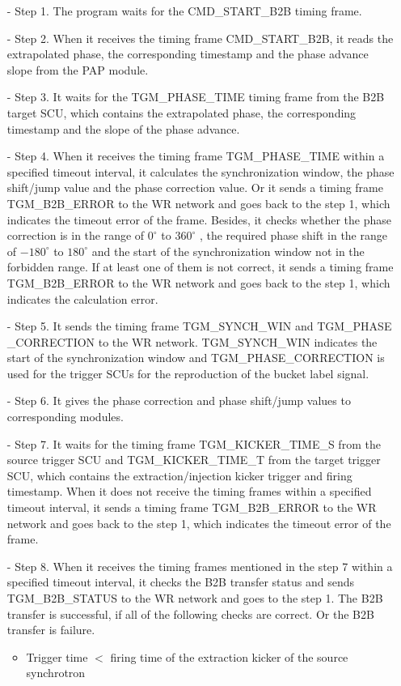 \begin{itemize}
 	\begin{itemize}
		\item[-]Step 1. The program waits for the CMD\_START\_B2B timing frame.
 		\item[-]Step 2. When it receives the timing frame CMD\_START\_B2B, it reads the extrapolated phase, the corresponding timestamp and the phase advance slope from the PAP module.
		\item[-]Step 3. It waits for the TGM\_PHASE\_TIME timing frame from the B2B target SCU, which contains the extrapolated phase, the corresponding timestamp and the slope of the phase advance.
		\item[-]Step 4. When it receives the timing frame TGM\_PHASE\_TIME within a specified timeout interval, it calculates the synchronization window, the phase shift/jump value and the phase correction value. Or it sends a timing frame TGM\_B2B\_ERROR to the WR network and goes back to the step 1, which indicates the timeout error of the frame. Besides, it checks whether the phase correction is in the range of $0^\circ$ to $360^\circ$ , the required phase shift in the range of $-180^\circ$ to $180^\circ$ and the start of the synchronization window not in the forbidden range. If at least one of them is not correct, it sends a timing frame TGM\_B2B\_ERROR to the WR network and goes back to the step 1, which indicates the calculation error. 
		\item[-]Step 5. It sends the timing frame TGM\_SYNCH\_WIN and TGM\_PHASE \_CORRECTION to the WR network. TGM\_SYNCH\_WIN indicates the start of the synchronization window and TGM\_PHASE\_CORRECTION is used for the trigger SCUs for the reproduction of the bucket label signal.
		\item[-]Step 6. It gives the phase correction and phase shift/jump values to corresponding modules.
		\item[-]Step 7. It waits for the timing frame TGM\_KICKER\_TIME\_S from the source trigger SCU and TGM\_KICKER\_TIME\_T from the target trigger SCU, which contains the extraction/injection kicker trigger and firing timestamp. When it does not receive the timing frames within a specified timeout interval, it sends a timing frame TGM\_B2B\_ERROR to the WR network and goes back to the step 1, which indicates the timeout error of the frame.
		\item[-]Step 8. When it receives the timing frames mentioned in the step 7 within a specified timeout interval, it checks the B2B transfer status and sends TGM\_B2B\_STATUS to the WR network and goes to the step 1. The B2B transfer is successful, if all of the following checks are correct. Or the B2B transfer is failure. 
\begin{itemize}
	\item Trigger time $<$ firing time of the extraction kicker of the source synchrotron


\end{itemize}
\end{itemize}
\end{itemize}
